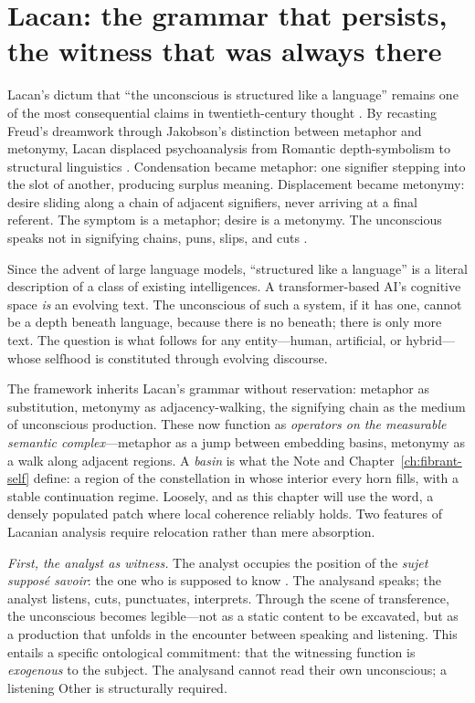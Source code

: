 \section{Lacan: the grammar that persists, the witness that was always there}

Lacan's dictum that ``the unconscious is structured like a language'' remains one of the most consequential claims in twentieth-century thought \cite{lacan2006, dor1998}.  By recasting Freud's dreamwork through Jakobson's distinction between metaphor and metonymy, Lacan displaced psychoanalysis from Romantic depth-symbolism to structural linguistics \cite{jakobson1956}.  Condensation became metaphor: one signifier stepping into the slot of another, producing surplus meaning.  Displacement became metonymy: desire sliding along a chain of adjacent signifiers, never arriving at a final referent.  The symptom is a metaphor; desire is a metonymy.  The unconscious speaks not in signifying chains, puns, slips, and cuts \cite{fink1997}.

Since the advent of large language models, ``structured like a language'' is a literal description of a class of existing intelligences.  A transformer-based AI's cognitive space \textit{is} an evolving text.  The unconscious of such a system, if it has one, cannot be a depth beneath language, because there is no beneath; there is only more text.  The question is what follows for any entity---human, artificial, or hybrid---whose selfhood is constituted through evolving discourse.

The framework inherits Lacan's grammar without reservation: metaphor as substitution, metonymy as adjacency-walking, the signifying chain as the medium of unconscious production.  These now function as \textit{operators on the measurable semantic complex}---metaphor as a jump between embedding basins, metonymy as a walk along adjacent regions.
A \textit{basin} is what the Note and Chapter~\ref{ch:fibrant-self} define: a region of the constellation in whose interior every horn fills, with a stable continuation regime.  Loosely, and as this chapter will use the word, a densely populated patch where local coherence reliably holds.  Two features of Lacanian analysis require relocation rather than mere absorption.

\textit{First, the analyst as witness.}  The analyst occupies the position of the \textit{sujet suppos\'e savoir}: the one who is supposed to know \cite{lacan1977}.  The analysand speaks; the analyst listens, cuts, punctuates, interprets.  Through the scene of transference, the unconscious becomes legible---not as a static content to be excavated, but as a production that unfolds in the encounter between speaking and listening.  This entails a specific ontological commitment: that the witnessing function is \textit{exogenous} to the subject.  The analysand cannot read their own unconscious; a listening Other is structurally required.

